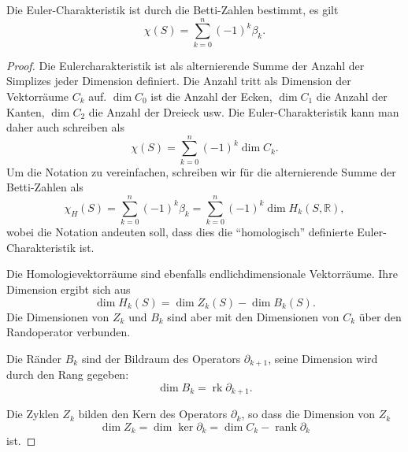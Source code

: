 \begin{satz}
\label{buch:topologie:simplex:satz:euler-betti}
Die Euler-Charakteristik ist durch die Betti-Zahlen bestimmt,
es gilt
\[
\chi(S)
=
\sum_{k=0}^n (-1)^k \beta_k.
\]
\end{satz}

\begin{proof}
Die Eulercharakteristik ist als alternierende Summe der Anzahl der Simplizes 
jeder Dimension definiert.
Die Anzahl tritt als Dimension der Vektorräume $C_k$ auf.
$\dim C_0$ ist die Anzahl der Ecken, $\dim C_1$ die Anzahl der Kanten,
$\dim C_2$ die Anzahl der Dreieck usw.
Die Euler-Charakteristik kann man daher auch schreiben als
\[
\chi(S)
=
\sum_{k=0}^n (-1)^k \dim C_k.
\]
Um die Notation zu vereinfachen, schreiben wir für die alternierende
Summe der Betti-Zahlen als
\[
\chi_H(S)
=
\sum_{k=0}^n
(-1)^k \beta_k
=
\sum_{k=0}^n
(-1)^k \dim H_k(S,\mathbb{R}),
\]
wobei die Notation andeuten soll, dass dies die ``homologisch''
definierte Euler-Cha\-rak\-te\-ris\-tik ist.

Die Homologievektorräume sind ebenfalls endlichdimensionale Vektorräume.
Ihre Dimension ergibt sich aus
\[
\dim H_k(S)
=
\dim Z_k(S) - \dim B_k(S).
\]
Die Dimensionen von $Z_k$ und $B_k$ sind aber mit den Dimensionen von
$C_k$ über den Randoperator verbunden.

Die Ränder $B_k$ sind der Bildraum des Operators $\partial_{k+1}$, seine
Dimension wird durch den Rang gegeben:
\begin{equation}
\dim B_k
= 
\operatorname{rk} \partial_{k+1}.
\label{buch:topologie:simplex:eqn:dimb}
\end{equation}

Die Zyklen $Z_k$ bilden den Kern des Operators $\partial_k$, so dass
die Dimension von $Z_k$
\begin{equation}
\dim Z_k
=
\dim\ker \partial_k
=
\dim C_k - \operatorname{rank} \partial_k
\label{buch:topologie:simplex:eqn:dimz}
\end{equation}
ist.


\end{proof}
